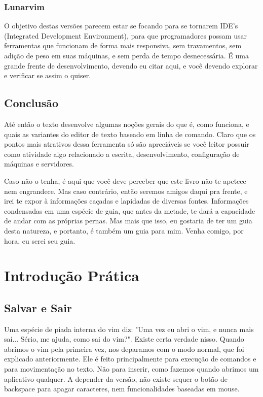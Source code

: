 \documentclass[a4paper, 12pt]{article}
\begin{document}
\subsubsection{Lunarvim}
O objetivo destas versões parecem estar se focando para se tornarem IDE's (Integrated Development Environment), para que programadores possam usar ferramentas que funcionam de forma mais responsiva, sem travamentos, sem adição de peso em suas máquinas, e sem perda de tempo desnecessária.
É uma grande frente de desenvolvimento, devendo eu citar aqui, e você devendo explorar e verificar se assim o quiser.

\subsection{Conclusão}
Até então o texto desenvolve algumas noções gerais do que é, como funciona, e quais as variantes do editor de texto baseado em linha de comando.
Claro que os pontos mais atrativos dessa ferramenta só são apreciáveis se você leitor possuir como atividade algo relacionado a escrita, desenvolvimento, configuração de máquinas e servidores.

Caso não o tenha, é aqui que você deve perceber que este livro não te apetece nem engrandece.
Mas caso contrário, então seremos amigos daqui pra frente, e irei te expor à informações caçadas e lapidadas de diversas fontes.
Informações condensadas em uma espécie de guia, que antes da metade, te dará a capacidade de andar com as próprias pernas.
Mas mais que isso, eu gostaria de ter um guia desta natureza, e portanto, é também um guia para mim.
Venha comigo, por hora, eu serei seu guia.


\section{Introdução Prática}
\subsection{Salvar e Sair}
Uma espécie de piada interna do vim diz: "Uma vez eu abri o vim, e nunca mais saí... Sério, me ajuda, como sai do vim?".
Existe certa verdade nisso.
Quando abrimos o vim pela primeira vez, nos deparamos com o modo normal, que foi explicado anteriormente.
Ele é feito principalmente para execução de comandos e para movimentação no texto.
Não para inserir, como fazemos quando abrimos um aplicativo qualquer.
A depender da versão, não existe sequer o botão de backspace para apagar caracteres, nem funcionalidades baseadas em mouse.
\end{document}
